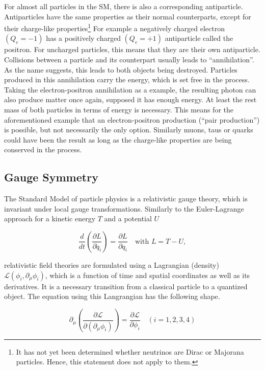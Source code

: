 For almost all particles in the SM, there is also a corresponding antiparticle. Antiparticles have the same properties as their normal counterparts, except for their charge-like properties\footnote{It has not yet been determined whether neutrinos are Dirac or Majorana particles. Hence, this statement does not apply to them.} For example a negatively charged electron $(Q_e = -1)$ has a positively charged $(Q_e = +1)$ antiparticle called the positron. For uncharged particles, this means that they are their own antiparticle. Collisions between a particle and its counterpart usually leads to ``annihilation''. As the name suggests, this leads to both objects being destroyed. Particles produced in this annihilation carry the energy, which is set free in the process. Taking the electron-positron annihilation as a example, the resulting photon can also produce matter once again, supposed it has enough energy. At least the rest mass of both particles in terms of energy is necessary. This means for the aforementioned example that an electron-positron production (``pair production'') is possible, but not necessarily the only option. Similarly muons, taus or quarks could have been the result as long as the charge-like properties are being conserved in the process.


\subsection{Gauge Symmetry}

The Standard Model of particle physics is a relativistic gauge theory, which is invariant under local gauge transformations. Similarly to the Euler-Lagrange approach for a kinetic energy $T$ and a potential $U$

\begin{equation}
  \label{eq:eulerlagrange}
  \frac{d}{dt} \left( \frac{\partial L}{\partial \dot{q}_i} \right) =  \frac{\partial L}{\partial q_i} \quad \text{with } L = T - U,
\end{equation}

\noindent relativistic field theories are formulated using a Lagrangian (density) $\mathcal{L} ( \phi_i, \partial_\mu \phi_i )$, which is a function of time and spatial coordinates as well as its derivatives. It is a necessary transition from a classical particle to a quantized object. The equation using this Langrangian has the following shape.

\begin{equation}
  \label{eq:lagrangian}
  \partial_\mu \left( \frac{\partial \mathcal{L}}{\partial (\partial_\mu \phi_i)} \right) = \frac{\partial \mathcal{L}}{\partial \phi_i} \quad (i = 1, 2, 3, 4)
\end{equation}

